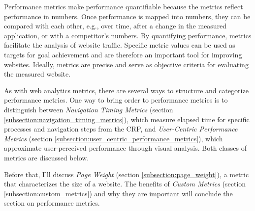 
Performance metrics make performance quantifiable because the metrics reflect performance in numbers.
Once performance is mapped into numbers, they can be compared with each other, e.g., over time, after a change in the measured application, or with a competitor's numbers. %
By quantifying performance, metrics facilitate the analysis of website traffic.
Specific metric values can be used as targets for goal achievement and are therefore an important tool for improving websites. %
Ideally, metrics are precise and serve as objective criteria for evaluating the measured website. %



As with web analytics metrics, there are several ways to structure and categorize performance metrics.
One way to bring order to performance metrics is to distinguish between \textit{Navigation Timing Metrics} (section \ref{subsection:navigation_timing_metrics}), which measure elapsed time for specific processes and navigation steps from the CRP, and \textit{User-Centric Performance Metrics} (section \ref{subsection:user_centric_performance_metrics}), which approximate user-perceived performance through visual analysis.
Both classes of metrics are discussed below.

Before that, I'll discuss \textit{Page Weight} (section \ref{subsection:page_weight}), a metric that characterizes the size of a website.
The benefits of \textit{Custom Metrics} (section \ref{subsection:custom_metrics}) and why they are important will conclude the section on performance metrics.






